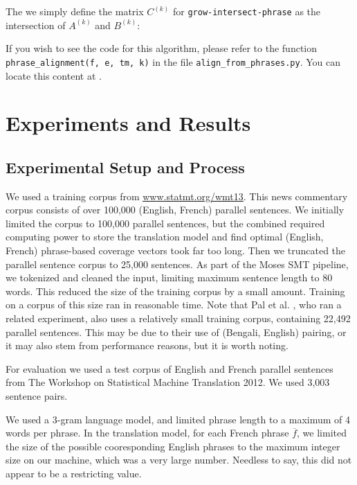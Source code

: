 \documentclass[twocolumn]{article}
\newcommand{\phraseIntersectAlign}{\texttt{grow-intersect-phrase}}
\begin{document}
The we simply define the matrix $C^{(k)}$ for \phraseIntersectAlign{}
as the intersection of $A^{(k)}$ and $B^{(k)}$:
\wrapSmall{\intersectMatrix{}}

If you wish to see the code for this algorithm, please refer to
the function \verb!phrase_alignment(f, e, tm, k)!
in the file \verb!align_from_phrases.py!.
You can locate this content at
\href{https://github.com/dbmikus/11-731.phrase-matrix-aligner}
     {}.

\section{Experiments and Results}
\subsection{Experimental Setup and Process}
We used a training corpus from
\href{http://www.statmt.org/wmt13/training-parallel-nc-v8.tgz}
     {\underline{www.statmt.org/wmt13}}.
This news commentary corpus consists of over 100,000 (English, French) parallel
sentences.
We initially limited the corpus to 100,000 parallel sentences, but the
combined required computing power to store the translation model and find
optimal (English, French) phrase-based coverage vectors took far too long.
Then we truncated the parallel sentence corpus to 25,000 sentences.
As part of the Moses SMT pipeline, we tokenized and cleaned the input, limiting
maximum sentence length to 80 words. This reduced the size of the training
corpus by a small amount.
Training on a corpus of this size ran in reasonable time. Note that
Pal et al. \cite{pnb2013},
who ran a related experiment, also uses a relatively small training corpus,
containing 22,492 parallel sentences. This may be due to their use of (Bengali,
English) pairing, or it may also stem from performance reasons, but it is worth
noting.

For evaluation we used a test corpus of English and French parallel sentences
from The Workshop on Statistical Machine Translation 2012. We used 3,003
sentence pairs.

We used a 3-gram language model, and limited phrase length to a maximum of 4
words per phrase. In the translation model,
for each French phrase $\overline{f}$, we
limited the size of the possible cooresponding English phrases to the maximum
integer size on our machine, which was a very large number. Needless to say,
this did not appear to be a restricting value.
\end{document}
